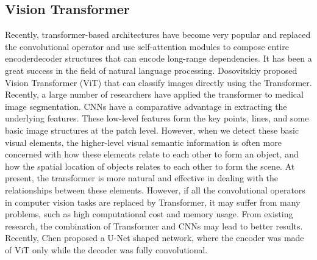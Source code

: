 \subsection{Vision Transformer}
Recently, transformer-based architectures have become very popular and replaced
the convolutional operator and use self-attention modules to compose entire
encoderdecoder structures that can encode long-range dependencies. It has been a
great success in the field of natural language processing.
Dosovitskiy \etal \cite{dosovitskiy2020image} proposed Vision Transformer (ViT)
that can classify images directly using the Transformer. Recently, a large
number of researchers have applied the transformer to medical image
segmentation. CNNs have a comparative advantage in extracting the underlying
features. These low-level features form the key points, lines, and some basic
image structures at the patch level. However, when we detect these basic visual
elements, the higher-level visual semantic information is often more concerned
with how these elements relate to each other to form an object, and how the
spatial location of objects relates to each other to form the scene. At present,
the transformer is more natural and effective in dealing with the relationships
between these elements. However, if all the convolutional operators in computer
vision tasks are replaced by Transformer, it may suffer from many problems, such
as high computational cost and memory usage. From existing research, the
combination of Transformer and CNNs may lead to better results.
Recently, Chen \etal \cite{chen2021transunet} proposed a U-Net shaped network,
where the encoder was made of ViT only while the decoder was fully
convolutional.

